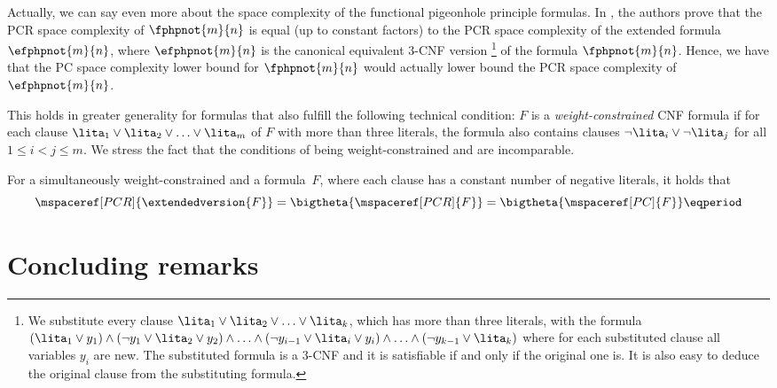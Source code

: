 %
%
%
%
%
%
%

Actually, we can say even more about the space complexity of the
functional pigeonhole principle formulas. In \cite{FLNRT15SpaceCplx},
the authors prove that the PCR space complexity of $\fphpnot{m}{n}$ is
equal (up to constant factors) to the PCR space complexity of the
extended formula $\efphpnot{m}{n}$, where $\efphpnot{m}{n}$ is the
canonical equivalent $3$-CNF version%
%
\footnote{We substitute every clause $\lita_{1}\lor\lita_{2}\lor \ldots \lor
  \lita_{k}$, which has more than three literals, with the formula
$(\lita_{1}\lor y_{1}) \land
(\lnot{y_{1}}\lor\lita_{2}\lor y_{2})
\land \ldots \land
(\lnot{y_{i-1}}\lor\lita_{i}\lor y_{i})
\land \ldots \land
(\lnot{y_{k-1}}\lor\lita_{k}) $
%
where for each substituted clause all variables $y_{i}$ are new. The
substituted formula is a $3$-CNF and it is satisfiable if and only if
the original one is. It is also easy to deduce the original clause
from the substituting formula.}
%
of the formula $\fphpnot{m}{n}$. Hence, we have that the PC
space complexity lower bound for $\fphpnot{m}{n}$ would actually lower
bound the PCR space complexity of $\efphpnot{m}{n}$.

This holds in greater generality for \varweightconstrained{} formulas
that also fulfill the following technical condition: $F$ is a
\emph{weight-constrained} CNF formula if for each clause $\lita_{1} \lor
\lita_{2} \lor \ldots \lor \lita_{m}$ of $F$ with more than three literals,
the formula also contains clauses $\lnot{\lita_{i}} \lor \lnot{\lita_{j}}$ for
all $1 \leq i < j \leq m$.
%
We stress the fact that the conditions of being weight-constrained and \varweightconstrained{} are incomparable.

\begin{corollary}
  For a simultaneously weight-constrained and a
  \varweightconstrained{} formula~$F$, where each clause has a constant
  number of negative literals, it holds that
  \begin{equation*}
    \mspaceref[PCR]{\extendedversion{F}} = \bigtheta{\mspaceref[PCR]{F}} = \bigtheta{\mspaceref[PC]{F}} \eqperiod
  \end{equation*}
\end{corollary}
 
%

\section{Concluding remarks}
\label{sec:concluding-remarks}

